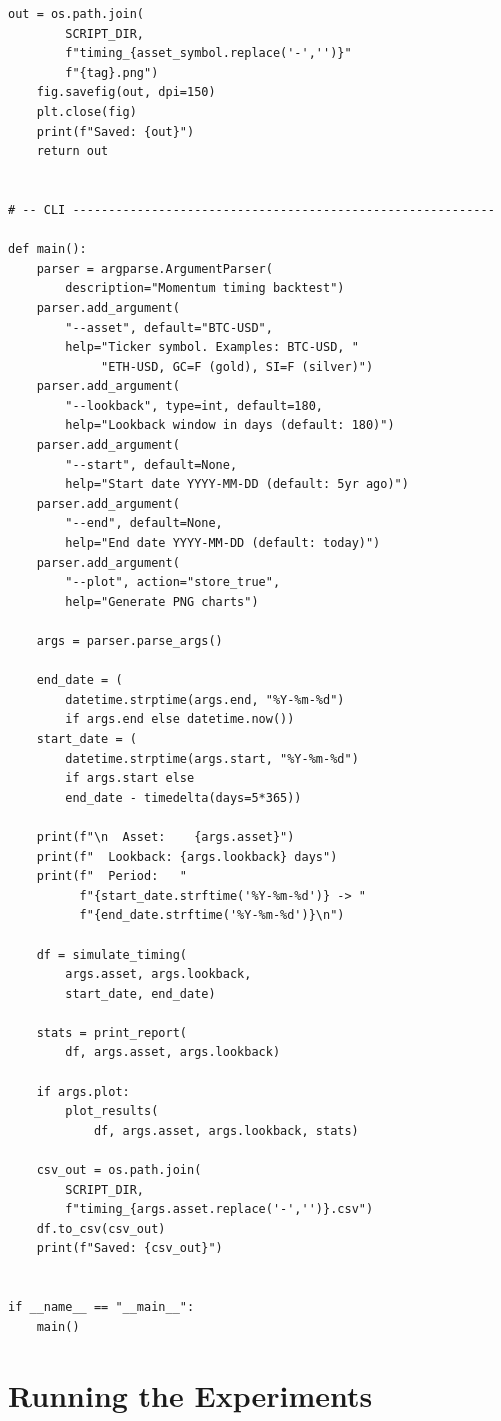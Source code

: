 \documentclass[11pt,a4paper]{article}
\begin{document}
\begin{codebox}
\begin{lstlisting}[style=python]
    out = os.path.join(
        SCRIPT_DIR,
        f"timing_{asset_symbol.replace('-','')}"
        f"{tag}.png")
    fig.savefig(out, dpi=150)
    plt.close(fig)
    print(f"Saved: {out}")
    return out


# -- CLI -----------------------------------------------------------

def main():
    parser = argparse.ArgumentParser(
        description="Momentum timing backtest")
    parser.add_argument(
        "--asset", default="BTC-USD",
        help="Ticker symbol. Examples: BTC-USD, "
             "ETH-USD, GC=F (gold), SI=F (silver)")
    parser.add_argument(
        "--lookback", type=int, default=180,
        help="Lookback window in days (default: 180)")
    parser.add_argument(
        "--start", default=None,
        help="Start date YYYY-MM-DD (default: 5yr ago)")
    parser.add_argument(
        "--end", default=None,
        help="End date YYYY-MM-DD (default: today)")
    parser.add_argument(
        "--plot", action="store_true",
        help="Generate PNG charts")

    args = parser.parse_args()

    end_date = (
        datetime.strptime(args.end, "%Y-%m-%d")
        if args.end else datetime.now())
    start_date = (
        datetime.strptime(args.start, "%Y-%m-%d")
        if args.start else
        end_date - timedelta(days=5*365))

    print(f"\n  Asset:    {args.asset}")
    print(f"  Lookback: {args.lookback} days")
    print(f"  Period:   "
          f"{start_date.strftime('%Y-%m-%d')} -> "
          f"{end_date.strftime('%Y-%m-%d')}\n")

    df = simulate_timing(
        args.asset, args.lookback,
        start_date, end_date)

    stats = print_report(
        df, args.asset, args.lookback)

    if args.plot:
        plot_results(
            df, args.asset, args.lookback, stats)

    csv_out = os.path.join(
        SCRIPT_DIR,
        f"timing_{args.asset.replace('-','')}.csv")
    df.to_csv(csv_out)
    print(f"Saved: {csv_out}")


if __name__ == "__main__":
    main()
\end{lstlisting}
\end{codebox}

\section{Running the Experiments}
\end{document}
